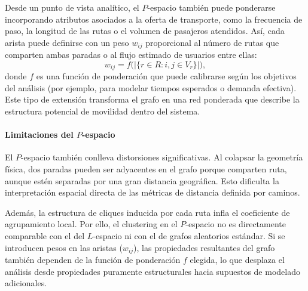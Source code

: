                 Desde un punto de vista analítico, el $P$-espacio también puede ponderarse incorporando atributos asociados a la oferta de transporte, como la frecuencia de paso, la longitud de las rutas o el volumen de pasajeros atendidos. Así, cada arista puede definirse con un peso $w_{ij}$ proporcional al número de rutas que comparten ambas paradas o al flujo estimado de usuarios entre ellas:
                $$
                w_{ij} = f\big(|\{r\in R : i,j\in V_r\}|\big),
                $$
                donde $f$ es una función de ponderación que puede calibrarse según los objetivos del análisis (por ejemplo, para modelar tiempos esperados o demanda efectiva). Este tipo de extensión transforma el grafo en una red ponderada que describe la estructura potencial de movilidad dentro del sistema.

                \paragraph{Limitaciones del $P$-espacio}
                El $P$-espacio también conlleva distorsiones significativas. Al colapsar la geometría física, dos paradas pueden ser adyacentes en el grafo porque comparten ruta, aunque estén separadas por una gran distancia geográfica. Esto dificulta la interpretación espacial directa de las métricas de distancia definida por caminos.
                
                Además, la estructura de cliques inducida por cada ruta infla el coeficiente de agrupamiento local. Por ello, el clustering en el $P$-espacio no es directamente comparable con el del $L$-espacio ni con el de grafos aleatorios estándar. Si se introducen pesos en las aristas ($w_{ij}$), las propiedades resultantes del grafo también dependen de la función de ponderación $f$ elegida, lo que desplaza el análisis desde propiedades puramente estructurales hacia supuestos de modelado adicionales.


